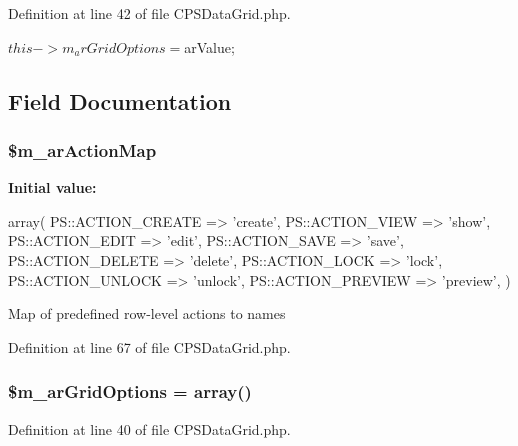 Definition at line 42 of file CPSDataGrid.php.




\begin{DoxyCode}
{ $this->m_arGridOptions = $arValue; }
\end{DoxyCode}




\subsection{Field Documentation}
\hypertarget{classCPSDataGrid_aca9359f1c287f1fdc37313507050fe58}{
\subsubsection[{\$m\_\-arActionMap}]{\setlength{\rightskip}{0pt plus 5cm}\$m\_\-arActionMap}}
\label{classCPSDataGrid_aca9359f1c287f1fdc37313507050fe58}
{\bfseries Initial value:}
\begin{DoxyCode}
 array(
        PS::ACTION_CREATE => 'create',
        PS::ACTION_VIEW => 'show',
        PS::ACTION_EDIT => 'edit',
        PS::ACTION_SAVE => 'save',
        PS::ACTION_DELETE => 'delete',
        PS::ACTION_LOCK => 'lock',
        PS::ACTION_UNLOCK => 'unlock',
        PS::ACTION_PREVIEW => 'preview',
    )
\end{DoxyCode}
Map of predefined row-\/level actions to names 

Definition at line 67 of file CPSDataGrid.php.

\hypertarget{classCPSDataGrid_acd4ff83641d8c0eac7c449802d557a21}{
\subsubsection[{\$m\_\-arGridOptions}]{\setlength{\rightskip}{0pt plus 5cm}\$m\_\-arGridOptions = {\bf array}()}}
\label{classCPSDataGrid_acd4ff83641d8c0eac7c449802d557a21}


Definition at line 40 of file CPSDataGrid.php.

